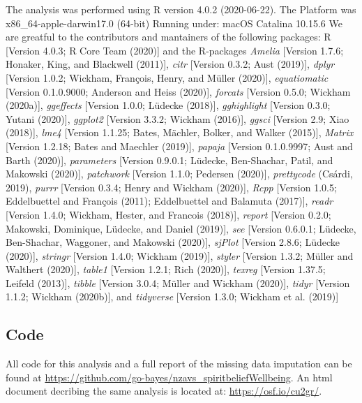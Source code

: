 \documentclass[
  english,
  man,floatsintext]{apa6}
\begin{document}
The analysis was performed using R version 4.0.2 (2020-06-22). The Platform was x86\_64-apple-darwin17.0 (64-bit) Running under: macOS Catalina 10.15.6 We are greatful to the contributors and mantainers of the following packages: R {[}Version 4.0.3; R Core Team (2020){]} and the R-packages \emph{Amelia} {[}Version 1.7.6; Honaker, King, and Blackwell (2011){]}, \emph{citr} {[}Version 0.3.2; Aust (2019){]}, \emph{dplyr} {[}Version 1.0.2; Wickham, François, Henry, and Müller (2020){]}, \emph{equatiomatic} {[}Version 0.1.0.9000; Anderson and Heiss (2020){]}, \emph{forcats} {[}Version 0.5.0; Wickham (2020a){]}, \emph{ggeffects} {[}Version 1.0.0; Lüdecke (2018){]}, \emph{gghighlight} {[}Version 0.3.0; Yutani (2020){]}, \emph{ggplot2} {[}Version 3.3.2; Wickham (2016){]}, \emph{ggsci} {[}Version 2.9; Xiao (2018){]}, \emph{lme4} {[}Version 1.1.25; Bates, Mächler, Bolker, and Walker (2015){]}, \emph{Matrix} {[}Version 1.2.18; Bates and Maechler (2019){]}, \emph{papaja} {[}Version 0.1.0.9997; Aust and Barth (2020){]}, \emph{parameters} {[}Version 0.9.0.1; Lüdecke, Ben-Shachar, Patil, and Makowski (2020){]}, \emph{patchwork} {[}Version 1.1.0; Pedersen (2020){]}, \emph{prettycode} (Csárdi, 2019), \emph{purrr} {[}Version 0.3.4; Henry and Wickham (2020){]}, \emph{Rcpp} {[}Version 1.0.5; Eddelbuettel and François (2011); Eddelbuettel and Balamuta (2017){]}, \emph{readr} {[}Version 1.4.0; Wickham, Hester, and Francois (2018){]}, \emph{report} {[}Version 0.2.0; Makowski, Dominique, Lüdecke, and Daniel (2019){]}, \emph{see} {[}Version 0.6.0.1; Lüdecke, Ben-Shachar, Waggoner, and Makowski (2020){]}, \emph{sjPlot} {[}Version 2.8.6; Lüdecke (2020){]}, \emph{stringr} {[}Version 1.4.0; Wickham (2019){]}, \emph{styler} {[}Version 1.3.2; Müller and Walthert (2020){]}, \emph{table1} {[}Version 1.2.1; Rich (2020){]}, \emph{texreg} {[}Version 1.37.5; Leifeld (2013){]}, \emph{tibble} {[}Version 3.0.4; Müller and Wickham (2020){]}, \emph{tidyr} {[}Version 1.1.2; Wickham (2020b){]}, and \emph{tidyverse} {[}Version 1.3.0; Wickham et al. (2019){]}

\hypertarget{code}{%
\subsection{Code}\label{code}}

All code for this analysis and a full report of the missing data imputation can be found at \url{https://github.com/go-bayes/nzavs_spiritbeliefWellbeing}. An html document decribing the same analysis is located at: \url{https://osf.io/cu2gr/}.
\end{document}
